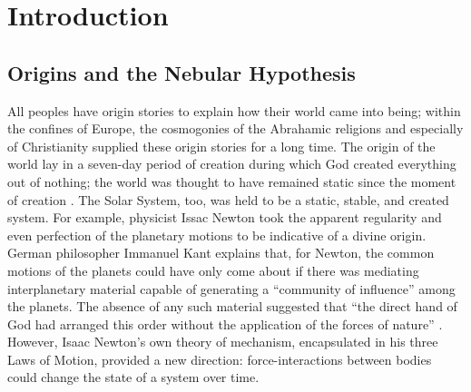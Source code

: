 \documentclass[12pt,oneside]{book}
\begin{document}
\frontmatter %

\pagestyle{empty}

% 
\tableofcontents \pagestyle{empty}

\mainmatter 
\pagestyle{fancy}
\fancyhf{}
\fancyhead[R]{\thepage}
\fancyhead[L]{\leftmark}
\renewcommand{\chaptermark}[1]{\markboth{\scshape \thechapter.\ #1} {}}


\chapter{Introduction}
\label{chapter: introduction}

\section{Origins and the Nebular Hypothesis}
\label{origins intro}

All peoples have origin stories to explain how their world came into being; within the confines of Europe, the cosmogonies of the Abrahamic religions and especially of Christianity supplied these origin stories for a long time.
The origin of the world lay in a seven-day period of creation during which God created everything out of nothing; the world was thought to have remained static since the moment of creation \citep{kragh17,luminet16}. 
The Solar System, too, was held to be a static, stable, and created system.
For example, physicist Issac Newton took the apparent regularity and even perfection of the planetary motions to be indicative of a divine origin.
German philosopher Immanuel Kant explains that, for Newton, the common motions of the planets could have only come about if there was mediating interplanetary material capable of generating a ``community of influence'' among the planets.
The absence of any such material suggested that ``the direct hand of God had arranged this order without the application of the forces of nature'' \citep[226-227]{kant_2012}.
However, Isaac Newton's own theory of mechanism, encapsulated in his three Laws of Motion, provided a new direction: force-interactions between bodies could change the state of a system over time.
\end{document}
